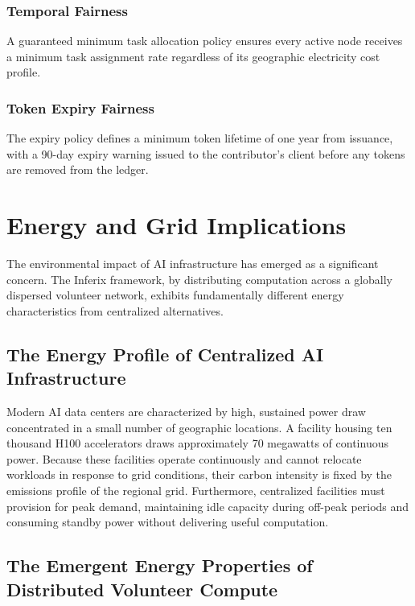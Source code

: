 \documentclass[12pt]{article}
\begin{document}
\subsubsection{Temporal Fairness}

A guaranteed minimum task allocation policy ensures every active node receives a minimum task assignment rate regardless of its geographic electricity cost profile.

\subsubsection{Token Expiry Fairness}

The expiry policy defines a minimum token lifetime of one year from issuance, with a 90-day expiry warning issued to the contributor's client before any tokens are removed from the ledger.

\section{Energy and Grid Implications}
\label{sec:energy}

The environmental impact of AI infrastructure has emerged as a significant concern. The Inferix framework, by distributing computation across a globally dispersed volunteer network, exhibits fundamentally different energy characteristics from centralized alternatives.

\subsection{The Energy Profile of Centralized AI Infrastructure}

Modern AI data centers are characterized by high, sustained power draw concentrated in a small number of geographic locations. A facility housing ten thousand H100 accelerators draws approximately 70 megawatts of continuous power. Because these facilities operate continuously and cannot relocate workloads in response to grid conditions, their carbon intensity is fixed by the emissions profile of the regional grid. Furthermore, centralized facilities must provision for peak demand, maintaining idle capacity during off-peak periods and consuming standby power without delivering useful computation.

\subsection{The Emergent Energy Properties of Distributed Volunteer Compute}
\end{document}
